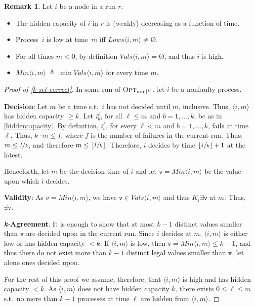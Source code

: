 \documentclass[11pt]{article}
\theoremstyle{definition}
\newtheorem{remark}{Remark}
\newcommand{\mv}{\mathtt{v}}
\newcommand{\existsv}{\exists{\mv}}
\newcommand{\minval}[1]{\ensuremath{\mathit{Min}\node{#1}}}
\newcommand{\knownvals}[1]{\ensuremath{\mathit{Vals}\node{#1}}}
\newcommand{\knownlows}[1]{\ensuremath{\mathit{Lows}\node{#1}}}
\newcommand{\eqdef}{\triangleq}
\newcommand{\OptMink}{\mbox{$\mbox{\sc Opt}_{\min[k]}$}}
\def\emptyset{\mbox{\O}}
\newcommand{\defemph}[1]{\textbf{\textit{#1}}}
\newcommand{\node}[1]{\langle#1\rangle}
\newcommand{\kAgreement}{{\bf \defemph{k}-Agreement}}
\newcommand{\Decision}{{\bf Decision}}
\newcommand{\Validity}{{\bf Validity}}
\begin{document}
\begin{remark}
Let $i$ be a node in a run $r$.
\begin{itemize}
\item
The hidden capacity of $i$ in $r$ is (weakly) decreasing as a function of time.
\item
Process~$i$ is low at time~$m$ iff $\knownlows{i,m} \ne \emptyset$.
\item
For all times $m<0$, by definition $\knownvals{i,m}=\emptyset$, and thus $i$ is high.
\item
$\minval{i,m}~\eqdef~\min\knownvals{i,m}$ for every time $m$.
\end{itemize}
\end{remark}

\begin{proof}[Proof of \cref{k-set-correct}]
In some run of $\OptMink$, let $i$ be a nonfaulty process.

\Decision:
Let $m$ be a time s.t.\ $i$ has not decided until $m$, inclusive.
Thus, $\node{i,m}$ has hidden capacity $\ge k$.
Let $i_b^{\ell}$, for all $\ell\le m$ and $b=1,\ldots,k$,
be as in \cref{hiddencapacity}.
By definition, $i_b^{\ell}$, for every $\ell < m$ and $b=1,\ldots,k$,
fails at time $\ell$. Thus, $k\cdot m \le f$, where $f$ is the number of failures
in the current run. Thus, $m \le \nicefrac{f}{k}$, and therefore
$m \le \lfloor \nicefrac{f}{k} \rfloor$.
Therefore, $i$ decides by time $\lfloor \nicefrac{f}{k} \rfloor +1$ at the latest.

Henceforth, let $m$ be the decision time of $i$
and let $\mathtt{v} = \minval{i,m}$ be the value upon which $i$ decides.

\Validity:
As $v = \minval{i,m}$, we have $\mathtt{v} \in \knownvals{i,m}$ and thus
$K_i \existsv$ at $m$. Thus, $\existsv$.

\kAgreement:
It is enough to show that at most $k-1$ distinct values
smaller than $\mathtt{v}$ are decided upon in the current run.
Since $i$ decides at $m$, $\node{i,m}$ is either low or has hidden capacity $<k$.
If $\node{i,m}$ is low, then $\mathtt{v} = \minval{i,m} \le k-1$, and thus
there do not exist more than $k-1$ distinct legal values smaller than $\mathtt{v}$,
let alone ones decided
upon.

For the rest of this proof we assume, therefore, that $\node{i,m}$ is
high and has hidden capacity $<k$.
As $\node{i,m}$ does not have hidden capacity $k$, there exists $0\le\ell\le m$
s.t.\ no more than $k-1$ processes at time $\ell$ are hidden from $\node{i,m}$.


\end{proof}
\end{document}
